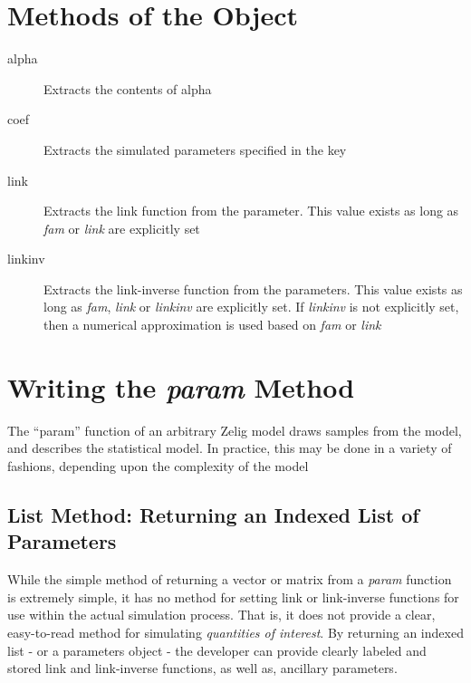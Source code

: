 \documentclass[a4paper,11pt]{article}
\begin{document}
\section{Methods of the  Object}

\begin{description}

	\item[alpha] Extracts the contents of alpha
	
	\item[coef] Extracts the simulated parameters specified in the key
	
	\item[link] Extracts the link function from the parameter.  This value
		exists as long as \emph{fam} or \emph{link} are explicitly set
	
	\item[linkinv] Extracts the link-inverse function from the parameters.
		This value exists as long as \emph{fam}, \emph{link} or \emph{linkinv}
		are explicitly set.  If \emph{linkinv} is not explicitly set, then a
		numerical approximation is used based on \emph{fam} or \emph{link}
		
\end{description}


\section{Writing the \emph{param} Method}

The ``param'' function of an arbitrary Zelig model draws samples from the
model, and describes the statistical model.  In practice, this may be done
in a variety of fashions, depending upon the complexity of the model


\subsection{List Method: Returning an Indexed List of Parameters}

While the simple method of returning a vector or matrix from a \emph{param} function is extremely simple, it has no method for setting link or link-inverse functions for use within the actual simulation process.  That is, it does not provide a clear, easy-to-read method for simulating \emph{quantities of interest}.  By returning an indexed list - or a parameters object - the developer can provide clearly labeled and stored link and link-inverse functions, as well as, ancillary parameters.
\end{document}
